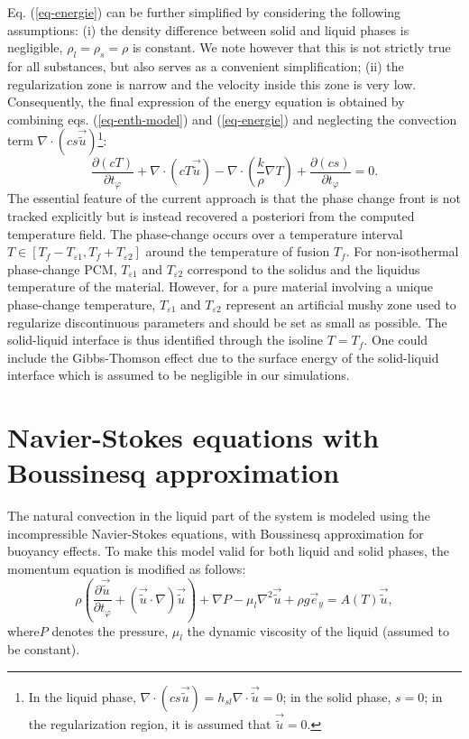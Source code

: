 Eq. (\ref{eq-energie}) can be further simplified by considering the following assumptions: (i) the density difference between solid and liquid phases is negligible, \ie $\rho_l=\rho_s=\rho$ is constant. 
We note however that this is not strictly true for all substances, but also serves as a convenient simplification; (ii) the regularization zone is narrow and the velocity inside this zone is very low. 
Consequently, the final expression of the energy equation is obtained by combining eqs. (\ref{eq-enth-model})  and (\ref{eq-energie}) and  neglecting the convection term $\nabla \cdot ( c s \vec{\tilde{u}})$\footnote{In the liquid phase, $\nabla \cdot ( c s \vec{\tilde{u}})  = h_{sl} \nabla \cdot  \vec{\tilde{u}}=0$; in the solid phase, $s=0$; in the regularization region, it is assumed that $\vec{\tilde{u}}=0.$}:
\begin{equation}\label{eq-energie-enth-model}
\frac{\partial \left(c T\right)}{\partial t_{\varphi}} + \nabla \cdot\left( c T \vec{\tilde{u}}\right) -
\nabla \cdot\left( \frac{k}{\rho} \nabla T \right) +  \frac{\partial \left(c s\right)}{\partial t_{\varphi}}  = 0.
\end{equation}
The essential feature of the current approach is that the phase change front is not tracked explicitly but is instead recovered a posteriori from the computed temperature field.
The phase-change occurs over a temperature interval $  T \in [T_f - T_{\varepsilon1}, T_f + T_{\varepsilon2}] $ around the temperature of fusion $T_f$.
For non-isothermal phase-change PCM, $T_{\varepsilon1}$ and $T_{\varepsilon2}$ correspond to the solidus and the liquidus temperature of the material.
However, for a pure material involving a unique phase-change temperature, $T_{\varepsilon1}$ and $T_{\varepsilon2}$ represent an artificial mushy zone used to regularize discontinuous parameters and should be set as small as possible.
The solid-liquid interface is thus identified through the isoline $T=T_f$.
One could include the Gibbs-Thomson effect due to the surface energy of the solid-liquid interface which is assumed to be negligible in our simulations.

\section{Navier-Stokes equations with Boussinesq approximation}

The natural convection in the liquid part of the system is modeled using the incompressible Navier-Stokes equations, with  Boussinesq approximation for buoyancy effects. To make this model valid for both liquid and solid phases, the momentum equation is modified as follows:
\begin{equation}\label{eq-momentum-conserv-1}
  \rho \left( \frac{\partial \vec{\tilde{u}}}{\partial t_{\varphi}} +   {(\vec{\tilde{u}}\cdot\nabla ) \vec{\tilde{u}}} \right) + \nabla P - \mu_{l}  {\nabla^2 \vec{\tilde{u}}} 
+ \rho g \vec{e}_y= A(T) \vec{\tilde{u}},
\end{equation}
where$P$ denotes the pressure, $\mu_{l}$ the dynamic viscosity of the liquid (assumed to be constant).  

